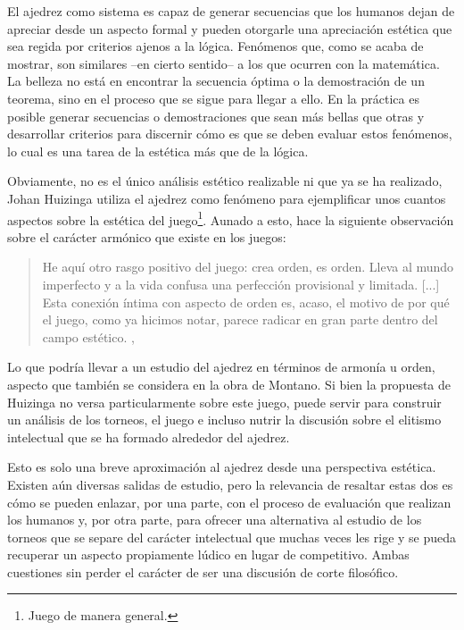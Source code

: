 \documentclass[twoside,openright,12pt,a4paper,spanish]{book}
\begin{document}
El ajedrez como sistema es capaz de generar secuencias que los humanos dejan de apreciar desde un aspecto formal y pueden otorgarle una apreciación estética que sea regida por criterios ajenos a la lógica. Fenómenos que, como se acaba de mostrar, son similares --en cierto sentido-- a los que ocurren con la matem\'atica. La belleza no est\'a en encontrar la secuencia \'optima o la demostraci\'on de un teorema, sino en el proceso que se sigue para llegar a ello. En la pr\'actica es posible generar secuencias o demostraciones que sean m\'as bellas que otras y desarrollar criterios para discernir c\'omo es que se deben evaluar estos fenómenos, lo cual es una tarea de la est\'etica m\'as que de la l\'ogica.

Obviamente, no es el \'unico an\'alisis est\'etico realizable ni que ya se ha realizado, Johan Huizinga utiliza el ajedrez como fenómeno para ejemplificar unos cuantos aspectos sobre la est\'etica del juego\footnote{Juego de manera general.}. Aunado a esto, hace la siguiente observación sobre el carácter armónico que existe en los juegos:

\begin{quote} \singlespace
 He aqu\'i otro rasgo positivo del juego: crea orden, es orden. Lleva al mundo imperfecto y a la vida confusa una perfecci\'on provisional y limitada. [...] Esta conexi\'on \'intima con aspecto de orden es, acaso, el motivo de por qu\'e el juego, como ya hicimos notar, parece radicar en gran parte dentro del campo est\'etico. \cite[p. 24]{huizinga2020homo},   
\end{quote}


Lo que podr\'ia llevar a un estudio del ajedrez en t\'erminos de armon\'ia u orden, aspecto que tambi\'en se considera en la obra de Montano. Si bien la propuesta de Huizinga no versa particularmente sobre este juego, puede servir para construir un an\'alisis de los torneos, el juego e incluso nutrir la discusi\'on sobre el elitismo intelectual que se ha formado alrededor del ajedrez. 

Esto es solo una breve aproximaci\'on al ajedrez desde una perspectiva est\'etica. Existen a\'un diversas salidas de estudio, pero la relevancia de resaltar estas dos es cómo se pueden enlazar, por una parte, con el proceso de evaluaci\'on que realizan los humanos y, por otra parte, para ofrecer una alternativa al estudio de los torneos que se separe del carácter intelectual que muchas veces les rige y se pueda recuperar un aspecto propiamente l\'udico en lugar de competitivo. Ambas cuestiones sin perder el carácter de ser una discusi\'on de corte filos\'ofico.
\end{document}
